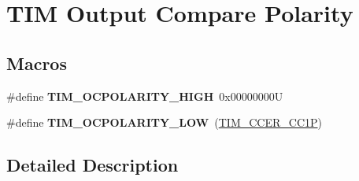 \hypertarget{group___t_i_m___output___compare___polarity}{}\section{T\+IM Output Compare Polarity}
\label{group___t_i_m___output___compare___polarity}
\subsection*{Macros}
\begin{DoxyCompactItemize}
\item 
\mbox{\label{group___t_i_m___output___compare___polarity_ga5887380660b742f0045e9695914231b8}} 
\#define {\bfseries T\+I\+M\+\_\+\+O\+C\+P\+O\+L\+A\+R\+I\+T\+Y\+\_\+\+H\+I\+GH}~0x00000000U
\item 
\mbox{\label{group___t_i_m___output___compare___polarity_ga1daff1574b0a2d17ccc9ae40a649ac37}} 
\#define {\bfseries T\+I\+M\+\_\+\+O\+C\+P\+O\+L\+A\+R\+I\+T\+Y\+\_\+\+L\+OW}~(\mbox{\hyperlink{group___peripheral___registers___bits___definition_ga0ca0aedba14241caff739afb3c3ee291}{T\+I\+M\+\_\+\+C\+C\+E\+R\+\_\+\+C\+C1P}})
\end{DoxyCompactItemize}


\subsection{Detailed Description}
